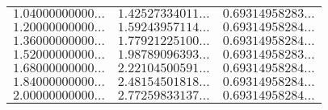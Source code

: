 \begin{table}
\begin{center}
\begin{tabular}{|c|c|c|}
$1.04000000000\ldots$ & $1.42527334011\ldots$ & $0.69314958283\ldots$ \\ 
$1.20000000000\ldots$ & $1.59243957114\ldots$ & $0.69314958284\ldots$ \\ 
$1.36000000000\ldots$ & $1.77921225100\ldots$ & $0.69314958284\ldots$ \\ 
$1.52000000000\ldots$ & $1.98789096393\ldots$ & $0.69314958283\ldots$ \\ 
$1.68000000000\ldots$ & $2.22104500591\ldots$ & $0.69314958284\ldots$ \\ 
$1.84000000000\ldots$ & $2.48154501818\ldots$ & $0.69314958284\ldots$ \\ 
$2.00000000000\ldots$ & $2.77259833137\ldots$ & $0.69314958284\ldots$ \\ 
\cline{1-3}
\end{tabular}
\end{center}
\end{table}

